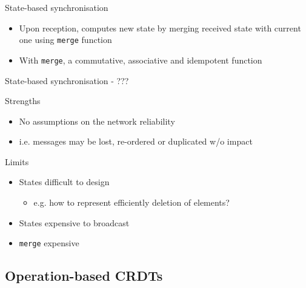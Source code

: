 \begin{frame}{State-based synchronisation}
    \begin{itemize}
        \item Upon reception, \alert{computes new state by merging received state with current one} using \texttt{merge} function
        \item With \texttt{merge}, a \alert{commutative, associative and idempotent function}
    \end{itemize}
\end{frame}

\begin{frame}{State-based synchronisation - ???}

    \begin{block}{Strengths}
        \begin{itemize}
            \item No assumptions on the network reliability
            \item i.e. messages may be lost, re-ordered or duplicated w/o impact
        \end{itemize}
    \end{block}
    \begin{block}{Limits}
        \begin{itemize}
            \item States difficult to design
            \begin{itemize}
                \item e.g. how to represent efficiently deletion of elements?
            \end{itemize}
            \item States expensive to broadcast
            \item \texttt{merge} expensive
        \end{itemize}
    \end{block}
\end{frame}

\subsection{Operation-based CRDTs}

